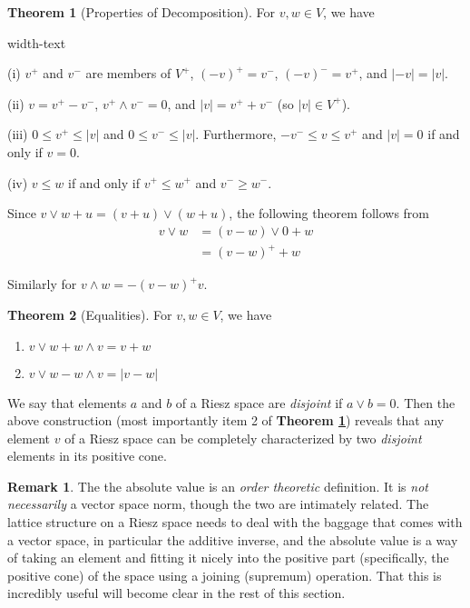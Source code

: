 \documentclass[letterpaper,10pt,oneside,onecolumn,reqno]{amsart}
\theoremstyle{definition}
\newtheorem{thm}{Theorem}
\newtheorem{rem}{Remark}
\newcommand{\meet}{\wedge}
\newcommand{\join}{\vee}
\begin{document}
  \begin{thm}[Properties of Decomposition]
    \label{thr:1}
    For $v,w \in V$, we have
    \begin{deflist}{width-text}
    \item
    \item[(i)] $v^+$ and $v^-$ are members of $V^+$, ${(-v)}^+=v^-$,
      ${(-v)}^-=v^+$, and $|-v|=|v|$.
    \item[(ii)] $v = v^+ - v^-$, $v^+ \meet v^-=0$, and $|v| =
      v^++v^-$ (so $|v| \in V^+$).
    \item[(iii)] $0 \leq v^+ \leq |v|$ and $0 \leq v^- \leq
      |v|$. Furthermore, $-v^- \leq v \leq v^+$ and $|v|=0$ if and
      only if $v=0$.
    \item[(iv)] $v \leq w$ if and only if $v^+ \leq w^+$ and $v^- \geq
      w^-$.
    \end{deflist}
  \end{thm}
  Since $v \join w + u = (v + u) \join (w + u)$, the following theorem
  follows from
  \begin{align*}
    v \join w &= (v-w) \join 0 + w \\
    &= {(v-w)}^+ + w
  \end{align*}

  Similarly for $v \meet w = -{(v-w)}^+ v$.

\begin{thm}[Equalities]\label{thr:2}
  For $v,w \in V$, we have
  \begin{enumerate}
  \item\label{item:1} $v \join w + w \meet v = v + w$
  \item\label{item:2} $v \join w - w \meet v = |v - w|$
  \end{enumerate}
\end{thm}


We say that elements $a$ and $b$ of a Riesz space are \emph{disjoint}
if $a \join b = 0$. Then the above construction (most importantly item
2 of \textbf{Theorem \ref{thr:1}}) reveals that any element $v$ of a
Riesz space can be completely characterized by two \emph{disjoint}
elements in its positive cone.

\begin{rem}\label{rem:6}
  The the absolute value is an \emph{order theoretic} definition. It
  is \emph{not necessarily} a vector space norm, though the two are
  intimately related. The lattice structure on a Riesz space needs to
  deal with the baggage that comes with a vector space, in particular
  the additive inverse, and the absolute value is a way of taking an
  element and fitting it nicely into the positive part (specifically,
  the positive cone) of the space using a joining (supremum)
  operation. That this is incredibly useful will become clear in the
  rest of this section.
\end{rem}
\end{document}
